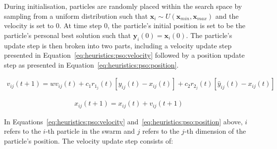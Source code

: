 During initialisation, particles are randomly placed within the search space by sampling from a uniform distribution such that $\boldsymbol{x}_{i} \sim U(\boldsymbol{x}_{min}, \boldsymbol{x}_{max})$ and the velocity is set to 0. At time step 0, the particle's initial position is set to be the particle's personal best solution such that $\boldsymbol{y}_{i}(0) = \boldsymbol{x}_{i}(0)$. The particle's update step is then broken into two parts, including a velocity update step presented in Equation~\eqref{eq:heuristics:pso:velocity} followed by a position update step as presented in Equation~\eqref{eq:heuristics:pso:position}.

\begin{equation}
	\label{eq:heuristics:pso:velocity}
	\begin{split}
		v_{ij}(t+1) = wv_{ij}(t) + c_{1}r_{1_{j}}(t)[y_{ij}(t) - x_{ij}(t)] + c_{2}r_{2_{j}}(t)[\hat{y}_{ij}(t) - x_{ij}(t)]
	\end{split}
\end{equation}

\begin{equation}
	\label{eq:heuristics:pso:position}
	\begin{split}
		x_{ij}(t+1) = x_{ij}(t) + v_{ij}(t+1)
	\end{split}
\end{equation}

In Equations~\eqref{eq:heuristics:pso:velocity} and~\eqref{eq:heuristics:pso:position} above, $i$ refers to the $i$-th particle in the swarm and $j$ refers to the $j$-th dimension of  the particle's position. The velocity update step consists of:

